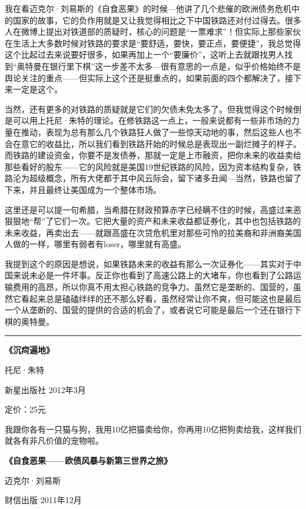 我在看迈克尔·刘易斯的《自食恶果》的时候---他讲了几个悲催的欧洲债务危机中的国家的故事，它的负作用就是又让我觉得相比之下中国铁路还对付过得去。很多人在微博上提出对铁道部的质疑时，核心的问题是``一票难求''！但实际上那些家伙在生活上大多数时候对铁路的要求是``要舒适，要快，要正点，要便捷''，我总觉得这个比起过去来说要好很多，如果再加上一个``要廉价''，这听上去就跟找男人找到``奥特曼在银行里下棋''这一步差不太多---很有意思的一点是，似乎价格始终不是舆论关注的重点------但实际上这个还是挺重点的，如果前面的四个都解决了，接下来一定是这个。

当然，还有更多的对铁路的质疑就是它们的欠债未免太多了。但我觉得这个时候倒是可以用上托尼·朱特的理论。在修铁路这一点上，一般来说都有一些非市场的力量在推动，表现为总有那么几个铁路狂人做了一些惊天动地的事，然后这些人也不会在意它的收益比，所以我们看到铁路开始的时候总是表现出一副烂摊子的样子。而铁路的建设资金，你要不是发债券，那就一定是上市融资，把你未来的收益卖给那些看好的股东------它的风险就是美国19世纪铁路的风险，因为资本结构复杂，铁路沦为超级概念，所有大佬都于其中风云际会，留下诸多丑闻---当然，铁路也留了下来，并且最终让美国成为一个整体市场。

这里还是可以提一句希腊，当希腊在财政预算赤字已经瞒不住的时候，高盛过来恶狠狠地``帮''了它们一次。它把大量的资产和未来收益都证券化，其中也包括铁路的未来收益，再卖出去------就跟高盛在次贷危机里对那些可怜的拉美裔和非洲裔美国人做的一样，哪里有弱者有loser，哪里就有高盛。

我提到这个的原因是想说，如果铁路未来的收益有那么一次证券化------其实对于中国来说未必是一件坏事。反正你也看到了高速公路上的大堵车，你也看到了公路运输费用的高昂，所以你真不用太担心铁路的竞争力。虽然它是垄断的、国营的，虽然它看起来总是磕磕绊绊的还不那么好看，虽然经常让你不爽，但可能这也是最后一个从垄断的、国营的提供的合适的机会了，或者说它可能是最后一个还在银行下棋的奥特曼。

\begin{center}\rule{3in}{0.4pt}\end{center}

\textbf{《沉疴遍地》}

托尼·朱特

新星出版社 2012年3月

定价：25元

我跟你各有一只猫与狗，我用10亿把猫卖给你，你再用10亿把狗卖给我，这样我们就各有非凡价值的宠物啦。

\textbf{《自食恶果------欧债风暴与新第三世界之旅》}

迈克尔·刘易斯

财信出版 2011年12月

